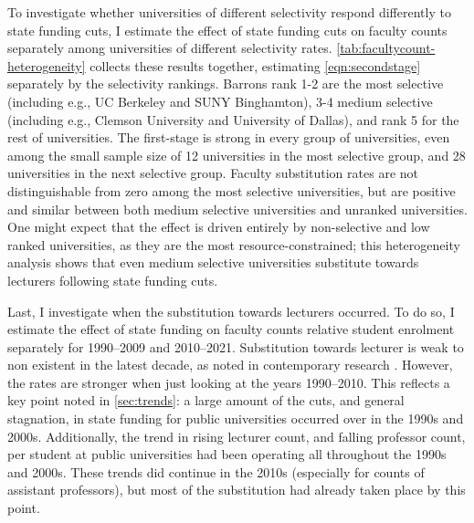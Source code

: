 To investigate whether universities of different selectivity respond differently to state funding cuts, I estimate the effect of state funding cuts on faculty counts separately among universities of different selectivity rates.
\autoref{tab:facultycount-heterogeneity} collects these results together, estimating \autoref{eqn:secondstage} separately by the \cite{barrons2009} selectivity rankings.
Barrons rank 1-2 are the most selective (including e.g., UC Berkeley and SUNY Binghamton), 3-4 medium selective (including e.g., Clemson University and University of Dallas), and rank 5 for the rest of universities.
The first-stage is strong in every group of universities, even among the small sample size of 12 universities in the most selective group, and 28 universities in the next selective group.
Faculty substitution rates are not distinguishable from zero among the most selective universities, but are positive and similar between both medium selective universities and unranked universities.
One might expect that the effect is driven entirely by non-selective and low ranked universities, as they are the most resource-constrained;
this heterogeneity analysis shows that even medium selective universities substitute towards lecturers following state funding cuts.

Last, I investigate when the substitution towards lecturers occurred.
To do so, I estimate the effect of state funding on faculty counts relative student enrolment separately for 1990--2009 and 2010--2021.
Substitution towards lecturer is weak to non existent in the latest decade, as noted in contemporary research \citep{hinrichs2022state}.
However, the rates are stronger when just looking at the years 1990--2010.
This reflects a key point noted in \autoref{sec:trends}: a large amount of the cuts, and general stagnation, in state funding for public universities occurred over in the 1990s and 2000s.
Additionally, the trend in rising lecturer count, and falling professor count, per student at public universities had been operating all throughout the 1990s and 2000s.
These trends did continue in the 2010s (especially for counts of assistant professors), but most of the substitution had already taken place by this point.

